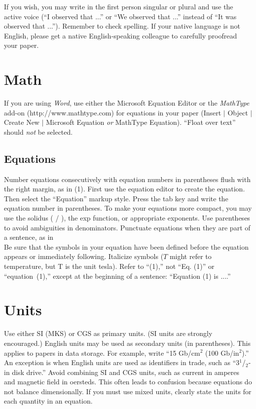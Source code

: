 \documentclass[journal]{IEEEtai}
\begin{document}
If you wish, you may write in the first person singular or plural and use the active voice (``I observed that ...'' or ``We observed that ...'' instead of ``It was observed that ...''). Remember to check spelling. If your native language is not English, please get a native English-speaking colleague to carefully proofread your paper.

\section{Math}

If you are using {\it Word}, use either the Microsoft Equation Editor or the {\it MathType} add-on (http://www.mathtype.com) for equations in your paper (Insert $|$ Object $|$ Create New $|$ Microsoft Equation {\it or} MathType Equation). ``Float over text'' should {\it not} be selected.

\subsection{Equations}

Number equations consecutively with equation numbers in parentheses flush with the right margin, as in (1). First use the equation editor to create the equation. Then select the ``Equation'' markup style. Press the tab key and write the equation number in parentheses. To make your equations more compact, you may use the solidus ( / ), the exp function, or appropriate exponents. Use parentheses to avoid ambiguities in denominators. Punctuate equations when they are part of a sentence, as in
\begin{equation}
\!
\end{equation}
Be sure that the symbols in your equation have been defined before the equation appears or immediately following. Italicize symbols ($T$ might refer to temperature, but T is the unit tesla). Refer to ``(1),'' not ``Eq. (1)'' or ``equation~(1),'' except at the beginning of a sentence: ``Equation (1) is ....''


\section{Units}

Use either SI (MKS) or CGS as primary units. (SI units are strongly encouraged.) English units may be used as secondary units (in parentheses). This applies to papers in data storage. For example, write ``15 Gb/cm$^2$ (100 Gb/in$^2$).'' An exception is when English units are used as identifiers in trade, such as ``3$^1${/}$_2$-in disk drive.'' Avoid combining SI and CGS units, such as current in amperes and magnetic field in oersteds. This often leads to confusion because equations do not balance dimensionally. If you must use mixed units, clearly state the units for each quantity in an equation.
\end{document}
